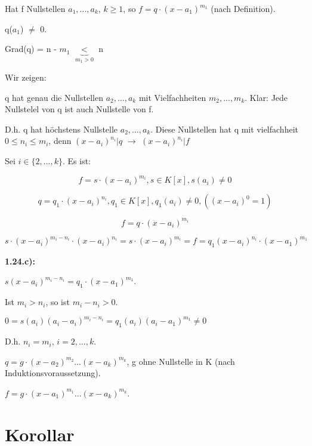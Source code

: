 \documentclass[a4paper, openany]{book}
\begin{document}
    Hat f Nullstellen $a_1,...,a_k$, $k \geq 1$, so $f = q \cdot (x-a_1)^{m_1}$ (nach Definition).

    q($a_1$) $\neq$ 0.

    Grad(q) = n - $m_1$ $\underbrace{<}_{m_1 > 0}$ n

    Wir zeigen: 

    \par \medskip

    q hat genau die Nullstellen $a_2,...,a_k$ mit Vielfachheiten $m_2,...,m_k$. Klar: Jede Nullstelel von q ist auch Nullstelle von f.

    D.h. q hat höchstens Nullstelle $a_2, ..., a_k$. Diese Nullstellen hat q mit vielfachheit $0 \leq n_i \leq m_i$, denn $(x-a_i)^{n_i}|q$ $\rightarrow$ $(x-a_i)^{n_i}|f$

    Sei $i \in \{2,...,k\}$. Es ist: 

    \begin{equation}
     f = s \cdot (x-a_i)^{m_i}, s \in K[x], s(a_i) \neq 0
    \end{equation}

    \begin{equation}
      q = q_1 \cdot (x-a_i)^{n_i}, q_1 \in K[x], q_1(a_i) \neq0, ((x-a_i)^0 = 1)
    \end{equation}

    \begin{equation}
      f = q \cdot (x-a_i)^{m_i}
    \end{equation}

    $s \cdot (x-a_i)^{m_i - n_i} \cdot (x-a_i)^{n_i} = s \cdot (x-a_i)^{m_i} = f = q_1 (x - a_i)^{n_i} \cdot (x-a_1)^{m_1}$

    \par \medskip

    \textbf{1.24.c):}

    $s (x-a_i)^{m_i - n_i} = q_1 \cdot (x-a_1)^{m_1}$.

    Ist $m_i > n_i$, so ist $m_i - n_i > 0$.

    $0 = s(a_i)(a_i-a_i)^{m_i - n_i} = q_1(a_i)(a_i-a_1)^{m_1} \neq 0$

    D.h. $n_i = m_i$, $i=2,...,k$.

    $q = g \cdot (x-a_2)^{m_2}...(x-a_k)^{m_k}$, g ohne Nullstelle in K (nach Induktionsvoraussetzung).

    $f = g \cdot (x-a_1)^{m_1}...(x-a_k)^{m_k}$.

    \section{Korollar}
\end{document}
